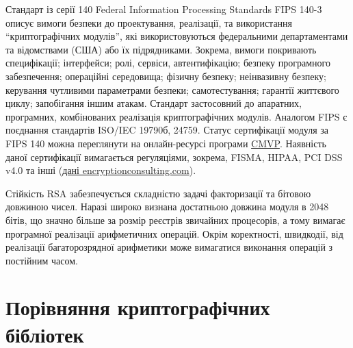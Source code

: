 \documentclass{kpi-lab}
\begin{document}
Стандарт із серії 140 Federal Information Processing
Standards FIPS 140-3 описує вимоги безпеки до проектування,
реалізації, та використання
\enquote{криптографічних модулів}, які використовуються
федеральними департаментами та відомствами (США) або їх підрядниками.
Зокрема, вимоги покривають
специфікації;
інтерфейси;
ролі, сервіси, автентифікацію;
безпеку програмного забезпечення;
операційні середовища;
фізичну безпеку;
неінвазивну безпеку;
керування чутливими параметрами безпеки;
самотестування;
гарантії життєвого циклу;
запобігання іншим атакам.
Стандарт застосовний до апаратних, програмних, комбінованих
реалізація криптографічних модулів.
Аналогом FIPS є поєднання стандартів ISO/IEC 19790б, 24759.
Статус сертифікації модуля за FIPS 140 можна
переглянути на онлайн-ресурсі програми
\href{https://csrc.nist.gov/projects/cryptographic-module-validation-program}
{CMVP}.
Наявність даної сертифікації вимагається регуляціями,
зокрема, FISMA, HIPAA, PCI DSS v4.0 та інші
(\href{https://www.encryptionconsulting.com/fips-compliance}
{дані encryptionconsulting.com}).

Стійкість RSA забезпечується складністю задачі факторизації
та бітовою довжиною чисел.
Наразі широко визнана достатньою довжина модуля в 2048 бітів,
що значно більше за розмір реєстрів звичайних
процесорів, а тому вимагає програмної реалізації
арифметичних операцій.
Окрім коректності, швидкодії, від реалізації
багаторозрядної арифметики
може вимагатися виконання операцій з постійним часом.

\chapter{Порівняння криптографічних бібліотек}
\end{document}
